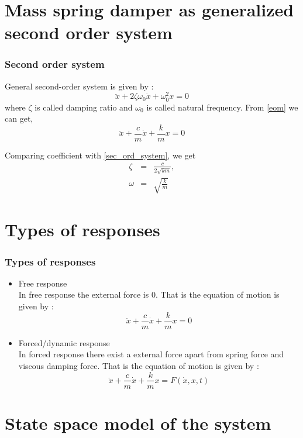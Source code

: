 \documentclass[10pt]{beamer}
\begin{document}
\section{Mass spring damper as generalized second order system}

\begin{frame}
\frametitle{Second order system}
General second-order system is given by :
\begin{equation}
\ddot{x} + 2\zeta\omega_0\dot{x} + \omega_0^2x = 0
\label{sec_ord_system}
\end{equation}
where $\zeta$ is called damping ratio and $\omega_0$ is called natural frequency.
From \ref{eom} we can get,
\begin{equation}
\ddot{x} + \frac{c}{m}\dot{x} + \frac{k}{m}x = 0
\label{mass_spring_system}
\end{equation}

Comparing coefficient with \ref{sec_ord_system}, we get
\begin{eqnarray}
\zeta &=& \frac{c}{2\sqrt{km}}, \\
\label{def_zeta}
\omega &=& \sqrt{\frac{k}{m}}
\label{def_omega}
\end{eqnarray}

\end{frame}

\section{Types of responses}

\begin{frame}
\frametitle{Types of responses}
\begin{itemize}
	\item{Free response}\\
	In free response the external force is 0. That is the equation of 
	motion is given by :
	$$ \ddot{x} + \frac{c}{m}\dot{x} + \frac{k}{m}x = 0 $$

	\item{Forced/dynamic response}\\
	In forced response there exist a external force apart from spring force and 
	viscous damping force. That is the equation of motion is given by :
	$$ \ddot{x} + \frac{c}{m}\dot{x} + \frac{k}{m}x = F(\dot{x},x,t) $$

\end{itemize}

\end{frame}


\section{State space model of the system}
\end{document}
